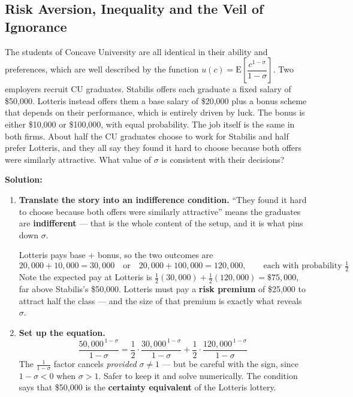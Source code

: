 \documentclass[12pt, letterpaper]{article}
\newcommand{\E}{\mathrm{E}}
\begin{document}
\subsection{Risk Aversion, Inequality and the Veil of Ignorance}

\begin{tcolorbox}[oddbox,title={Problem 2.7 \quad Measuring Risk Aversion}]
\begin{tcolorbox}[questionbox]
The students of Concave University are all identical in their ability and preferences, which
are well described by the function $u(c) = \E\left[\dfrac{c^{1-\sigma}}{1-\sigma}\right]$.
Two employers recruit CU graduates. Stabilis offers each graduate a fixed salary of \$50,000.
Lotteris instead offers them a base salary of \$20,000 plus a bonus scheme that depends on
their performance, which is entirely driven by luck. The bonus is either \$10,000 or
\$100,000, with equal probability. The job itself is the same in both firms. About half the
CU graduates choose to work for Stabilis and half prefer Lotteris, and they all say they
found it hard to choose because both offers were similarly attractive. What value of $\sigma$
is consistent with their decisions?
\end{tcolorbox}

\textbf{Solution:}

\begin{enumerate}

\item \textbf{Translate the story into an indifference condition.} ``They found it hard to
choose because both offers were similarly attractive'' means the graduates are
\textbf{indifferent} --- that is the whole content of the setup, and it is what pins down
$\sigma$.

Lotteris pays base $+$ bonus, so the two outcomes are
$$20{,}000 + 10{,}000 = 30{,}000 \quad\text{or}\quad 20{,}000 + 100{,}000 = 120{,}000,
\qquad \text{each with probability } \tfrac12$$
Note the expected pay at Lotteris is $\tfrac12(30{,}000) + \tfrac12(120{,}000) = \$75{,}000$,
far above Stabilis's \$50,000. Lotteris must pay a \textbf{risk premium} of \$25,000 to
attract half the class --- and the size of that premium is exactly what reveals $\sigma$.

\item \textbf{Set up the equation.}
$$\frac{50{,}000^{\,1-\sigma}}{1-\sigma}
= \frac{1}{2}\cdot\frac{30{,}000^{\,1-\sigma}}{1-\sigma}
+ \frac{1}{2}\cdot\frac{120{,}000^{\,1-\sigma}}{1-\sigma}$$
The $\frac{1}{1-\sigma}$ factor cancels \emph{provided} $\sigma \ne 1$ --- but be careful
with the sign, since $1-\sigma < 0$ when $\sigma > 1$. Safer to keep it and solve
numerically. The condition says that \$50,000 is the \textbf{certainty equivalent} of the
Lotteris lottery.


\end{enumerate}
\end{tcolorbox}
\end{document}
